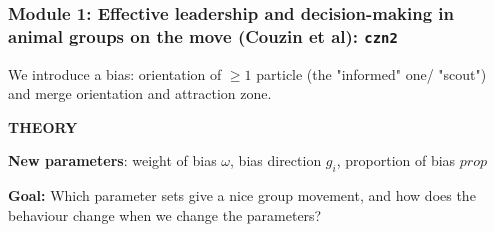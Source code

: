 \documentclass[compress]{beamer}
\begin{document}

\begin{frame}
  \frametitle{Module 1: Effective leadership and decision-making in animal groups on the move (Couzin et al): \texttt{czn2}}
  
  We introduce a bias: orientation of \( \geq 1 \) particle (the "informed" one/ "scout") and merge orientation and attraction zone.
  
  
  \hspace{1cm}
  
 
 \textbf{THEORY} 
 
 \hspace{1cm}
 
\textbf{New parameters}: weight of bias \( \omega  \), bias direction \( g_{i}\), proportion of bias \( prop  \)

\textbf{Goal:} Which parameter sets give a nice group movement, and how does the behaviour change when we change the parameters?

\hspace{1cm}

\end{frame}


%	
%	
%	
%	
%	
\end{document}
